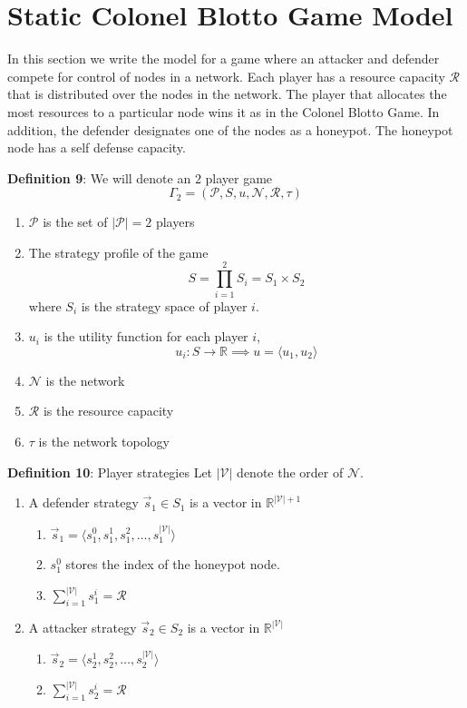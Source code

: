 \documentclass[conference]{IEEEtran}
\begin{document}
\section{Static Colonel Blotto Game Model}

In this section we write the model for a game where an attacker and defender compete for control of nodes in a network. Each player has a resource capacity $\mathcal{R}$ that is distributed over the nodes in the network. The player that allocates the most resources to a particular node wins it as in the Colonel Blotto Game. In addition, the defender designates one of the nodes as a honeypot. The honeypot node has a self defense capacity.

\textbf{Definition 9}: We will denote an $2$ player game $$\Gamma_2 = (\mathcal{P}, S, u, \mathcal{N}, \mathcal{R}, \tau)$$
\begin{enumerate}
\item $\mathcal{P}$ is the set of $|\mathcal{P}| = 2$ players
\item The strategy profile of the game $$S = \displaystyle \prod_{i = 1}^2 S_i = S_1 \times S_2$$ where $S_i$ is the strategy space of player $i$.
\item $u_i$ is the utility function for each player $i$, $$u_i \mathpunct{:} S \to \mathbb{R} \implies u = \langle u_1, u_2 \rangle$$
\item $\mathcal{N}$ is the network
\item $\mathcal{R}$ is the resource capacity
\item $\tau$ is the network topology
\end{enumerate}


\textbf{Definition 10}: Player strategies
Let $|\mathcal{V}|$ denote the order of $\mathcal{N}$.
\begin{enumerate}
\item A defender strategy $\vec{s}_1 \in S_1$ is a vector in $\mathbb{R}^{|\mathcal{V}| + 1}$
\begin{enumerate}
\item $\vec{s}_1 = \langle s_1^0, s_1^1, s_1^2, \ldots, s_1^{|\mathcal{V}|} \rangle$
\item $s_1^0$ stores the index of the honeypot node.
\item $\displaystyle \sum_{i = 1}^{|\mathcal{V}|} s_1^i = \mathcal{R}$
\end{enumerate}
\item A attacker strategy $\vec{s}_2 \in S_2$ is a vector in $\mathbb{R}^{|\mathcal{V}|}$
\begin{enumerate}
\item $\vec{s}_2 = \langle s_2^1, s_2^2, \ldots, s_2^{|\mathcal{V}|} \rangle$
\item $\displaystyle \sum_{i = 1}^{|\mathcal{V}|} s_2^i = \mathcal{R}$
\end{enumerate}
\end{enumerate}
\end{document}
